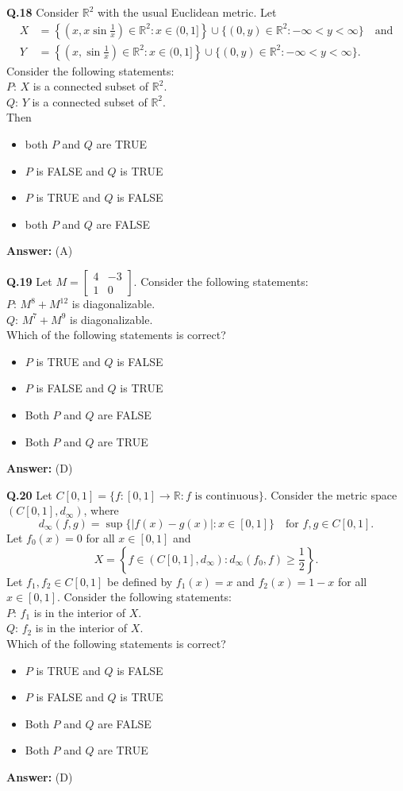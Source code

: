 \documentclass[11pt,a4paper]{article}
\newcommand{\optslistA}[4]{%
  \begin{itemize}
    \setlength{\itemsep}{2pt}\setlength{\parskip}{0pt}
    \item[(A)] #1
    \item[(B)] #2
    \item[(C)] #3
    \item[(D)] #4
  \end{itemize}%
}
\newcommand{\ans}[1]{\textbf{Answer:} #1\par\medskip}
\begin{document}
\textbf{Q.18} Consider $\mathbb{R}^2$ with the usual Euclidean metric. Let
\begin{align*}
  X &= \left\{\left(x, x \sin\frac{1}{x}\right) \in \mathbb{R}^2 : x \in (0, 1]\right\} \cup \{(0, y) \in \mathbb{R}^2 : -\infty < y < \infty\} \quad \text{and} \\
  Y &= \left\{\left(x, \sin\frac{1}{x}\right) \in \mathbb{R}^2 : x \in (0, 1]\right\} \cup \{(0, y) \in \mathbb{R}^2 : -\infty < y < \infty\}.
\end{align*}
Consider the following statements:\\
$P$: $X$ is a connected subset of $\mathbb{R}^2$.\\
$Q$: $Y$ is a connected subset of $\mathbb{R}^2$.\\
Then
\optslistA{both $P$ and $Q$ are TRUE}{$P$ is FALSE and $Q$ is TRUE}{$P$ is TRUE and $Q$ is FALSE}{both $P$ and $Q$ are FALSE}
\ans{(A)}

\textbf{Q.19} Let $M = \begin{bmatrix} 4 & -3 \\ 1 & 0 \end{bmatrix}$. Consider the following statements:\\
$P$: $M^8 + M^{12}$ is diagonalizable.\\
$Q$: $M^7 + M^9$ is diagonalizable.\\
Which of the following statements is correct?
\optslistA{$P$ is TRUE and $Q$ is FALSE}{$P$ is FALSE and $Q$ is TRUE}{Both $P$ and $Q$ are FALSE}{Both $P$ and $Q$ are TRUE}
\ans{(D)}

\textbf{Q.20} Let $C[0, 1] = \{f : [0, 1] \to \mathbb{R} : f \text{ is continuous}\}$. Consider the metric space $(C[0, 1], d_\infty)$, where
\[
  d_\infty(f, g) = \sup\{|f(x) - g(x)| : x \in [0, 1]\} \quad \text{for } f, g \in C[0, 1].
\]
Let $f_0(x) = 0$ for all $x \in [0, 1]$ and
\[
  X = \left\{f \in (C[0, 1], d_\infty) : d_\infty(f_0, f) \ge \frac{1}{2}\right\}.
\]
Let $f_1, f_2 \in C[0, 1]$ be defined by $f_1(x) = x$ and $f_2(x) = 1 - x$ for all $x \in [0, 1]$. Consider the following statements:\\
$P$: $f_1$ is in the interior of $X$.\\
$Q$: $f_2$ is in the interior of $X$.\\
Which of the following statements is correct?
\optslistA{$P$ is TRUE and $Q$ is FALSE}{$P$ is FALSE and $Q$ is TRUE}{Both $P$ and $Q$ are FALSE}{Both $P$ and $Q$ are TRUE}
\ans{(D)}
\end{document}
